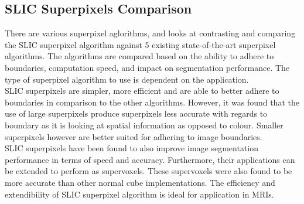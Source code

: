 \subsection{SLIC Superpixels Comparison}
\label{lit:sp}
There are various superpixel aglorithms, and \cite{ref:sp_1} looks at contrasting and comparing the SLIC superpixel algorithm against 5 existing state-of-the-art superpixel algorithms. The algorithms are compared based on the ability to adhere to boundaries, computation speed, and impact on segmentation performance. The type of superpixel algorithm to use is dependent on the application. 
\\[1\baselineskip]
SLIC superpixels are simpler, more efficient and are able to better adhere to boundaries in comparison to the other algorithms. However, it was found that the use of large superpixels produce superpixels less accurate with regards to boundary as it is looking at spatial information as opposed to colour. Smaller superpixels however are better suited for adhering to image boundaries. 
\\[1\baselineskip]
SLIC superpixels have been found to also improve image segmentation performance in terms of speed and accuracy. Furthermore, their applications can be extended to perform as supervoxels. These supervoxels were also found to be more accurate than other normal cube implementations. The efficiency and extendibility of SLIC superpixel algorithm is ideal for application in MRIs.


